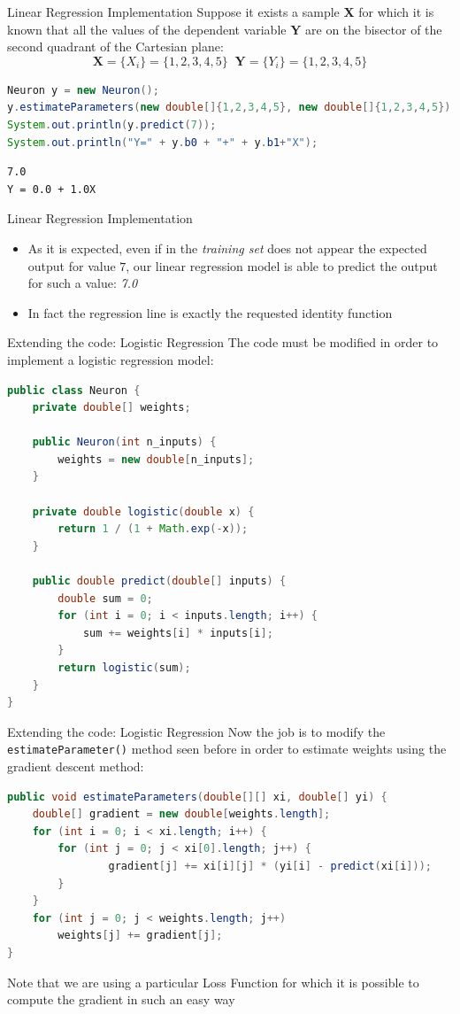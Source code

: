 \documentclass[xcolor ={table,usenames,dvipsnames}]{beamer}
\theoremstyle{definition}
\begin{document}
\begin{frame}[fragile]{Linear Regression Implementation}
Suppose it exists a sample \textbf{X} for which it is known that all the values of the dependent variable \textbf{Y} are on the bisector of the second quadrant of the Cartesian plane:
$$
\textbf{X} = \{X_i\} = \{1,2,3,4,5\}
\;\;
\textbf{Y} = \{Y_i\} = \{1,2,3,4,5\}
$$
\begin{lstlisting}[language = Java]
Neuron y = new Neuron();
y.estimateParameters(new double[]{1,2,3,4,5}, new double[]{1,2,3,4,5});
System.out.println(y.predict(7));
System.out.println("Y=" + y.b0 + "+" + y.b1+"X");
\end{lstlisting}
\begin{lstlisting}
7.0
Y = 0.0 + 1.0X
\end{lstlisting}
\end{frame}
\begin{frame}[fragile]{Linear Regression Implementation}
\begin{itemize}
\item As it is expected, even if in the \emph{training set} does not appear the expected output for value $7$, our linear regression model is able to predict the output for such a value: \textit{7.0}
\item In fact the regression line is exactly the requested identity function
\end{itemize}
\end{frame}
\begin{frame}[fragile]{Extending the code: Logistic Regression}
The code must be modified in order to implement a logistic regression model:
\begin{lstlisting}[language=Java]
public class Neuron {
	private double[] weights;

	public Neuron(int n_inputs) {
		weights = new double[n_inputs];
	}

	private double logistic(double x) {
		return 1 / (1 + Math.exp(-x));
	}

	public double predict(double[] inputs) {
		double sum = 0;
		for (int i = 0; i < inputs.length; i++) {
			sum += weights[i] * inputs[i];
		}
		return logistic(sum);
	}
}
\end{lstlisting}
\end{frame}
\begin{frame}[fragile]{Extending the code: Logistic Regression}
Now the job is to modify the \texttt{estimateParameter()} method seen before in order to estimate weights using the gradient descent method:
\begin{lstlisting}[language=Java]
public void estimateParameters(double[][] xi, double[] yi) {
	double[] gradient = new double[weights.length];
	for (int i = 0; i < xi.length; i++) {
		for (int j = 0; j < xi[0].length; j++) {
				gradient[j] += xi[i][j] * (yi[i] - predict(xi[i]));
		}
	}
	for (int j = 0; j < weights.length; j++)
		weights[j] += gradient[j];
}
\end{lstlisting}
Note that we are using a particular Loss Function for which it is possible to compute the gradient in such an easy way
\end{frame}
\end{document}

